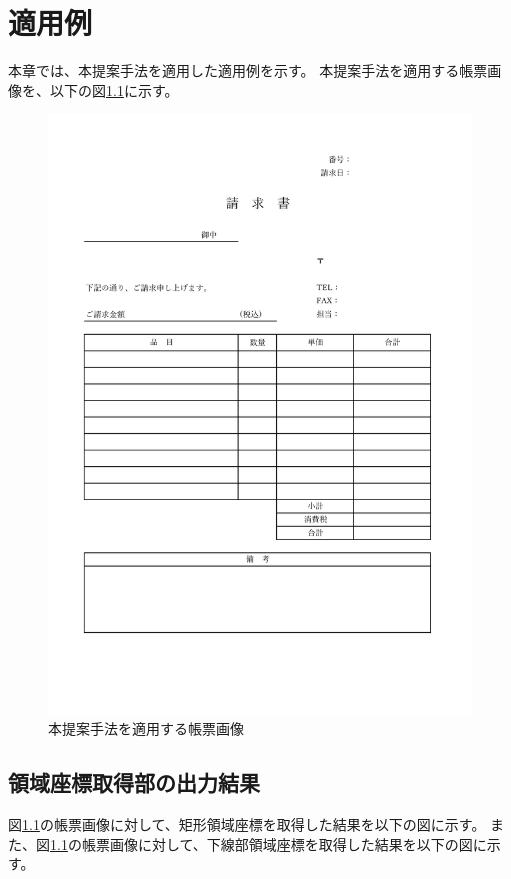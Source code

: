 \chapter{適用例}\label{cha:Indication}
本章では、本提案手法を適用した適用例を示す。
本提案手法を適用する帳票画像を、以下の図\ref{fig:indication_original}に示す。

\begin{figure}[t]
    \begin{center}
        \includegraphics[width=15cm]{image/05-indication/indication_original.jpg}
        \caption{本提案手法を適用する帳票画像}
        \label{fig:indication_original}
    \end{center}
\end{figure}


\section{領域座標取得部の出力結果}\label{sec:result_area_coords_obtainment}
図\ref{fig:indication_original}の帳票画像に対して、矩形領域座標を取得した結果を以下の図に示す。
また、図\ref{fig:indication_original}の帳票画像に対して、下線部領域座標を取得した結果を以下の図に示す。


